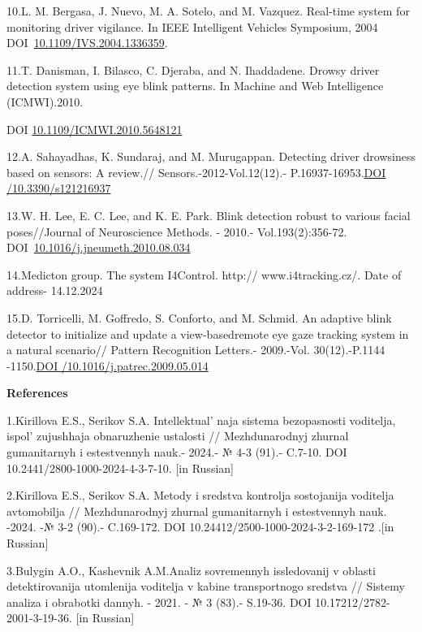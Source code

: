 10.L. M. Bergasa, J. Nuevo, M. A. Sotelo, and M. Vazquez. Real-time
system for monitoring driver vigilance. In IEEE Intelligent Vehicles
Symposium, 2004
DOI~\href{https://doi.org/10.1109/IVS.2004.1336359}{10.1109/IVS.2004.1336359}.

11.T. Danisman, I. Bilasco, C. Djeraba, and N. Ihaddadene. Drowsy driver
detection system using eye blink patterns. In Machine and Web
Intelligence (ICMWI).2010.

DOI
\href{http://dx.doi.org/10.1109/ICMWI.2010.5648121}{10.1109/ICMWI.2010.5648121}

12.A. Sahayadhas, K. Sundaraj, and M. Murugappan. Detecting driver
drowsiness based on sensors: A review.// Sensors.-2012-Vol.12(12).-
P.16937-16953.\href{https://doi.org/10.3390/s121216937}{DOI
/10.3390/s121216937}

13.W. H. Lee, E. C. Lee, and K. E. Park. Blink detection robust to
various facial poses//Journal of Neuroscience Methods. - 2010.-
Vol.193(2):356-72.
DOI~\href{https://doi.org/10.1016/j.jneumeth.2010.08.034}{10.1016/j.jneumeth.2010.08.034}

14.Medicton group. The system I4Control. http:// www.i4tracking.cz/.
Date of address- 14.12.2024

15.D. Torricelli, M. Goffredo, S. Conforto, and M. Schmid. An adaptive
blink detector to initialize and update a view-basedremote eye gaze
tracking system in a natural scenario// Pattern Recognition Letters.-
2009.-Vol. 30(12).-P.1144
-1150.\href{https://doi.org/10.1016/j.patrec.2009.05.014}{DOI
/10.1016/j.patrec.2009.05.014}

{\bfseries References}

1.Kirillova E.S., Serikov S.A. Intellektual' naja sistema
bezopasnosti voditelja, ispol' zujushhaja obnaruzhenie
ustalosti // Mezhdunarodnyj zhurnal gumanitarnyh i estestvennyh nauk.-
2024.- № 4-3 (91).- C.7-10. DOI 10.2441/2800-1000-2024-4-3-7-10. {[}in
Russian{]}

2.Kirillova E.S., Serikov S.A. Metody i sredstva kontrolja sostojanija
voditelja avtomobilja // Mezhdunarodnyj zhurnal gumanitarnyh i
estestvennyh nauk. -2024. -№ 3-2 (90).- C.169-172. DOI
10.24412/2500-1000-2024-3-2-169-172 .{[}in Russian{]}

3.Bulygin A.O., Kashevnik A.M.Analiz sovremennyh issledovanij v oblasti
detektirovanija utomlenija voditelja v kabine transportnogo sredstva //
Sistemy analiza i obrabotki dannyh. - 2021. - № 3 (83).- S.19-36. DOI
10.17212/2782-2001-3-19-36. {[}in Russian{]}

